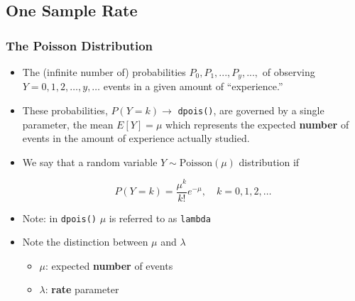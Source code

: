 \documentclass[10pt,handout]{beamer}\usepackage[]{graphicx}\usepackage[]{color}
\begin{document}
\subsection{One Sample Rate}

\begin{frame}
	\frametitle{The Poisson Distribution}
	
	\begin{itemize}
		\small
		\setlength\itemsep{1em}
		\item The (infinite number of) probabilities $P_{0}, P_{1}, ..., P_{y}, ..., $ of observing 
		$Y = 0, 1, 2, \dots , y, \dots $ events in a given amount of ``experience.'' 
		
		\item These probabilities, $P(Y = k) \to$ \texttt{dpois()}, are governed by a single parameter, the mean $E[Y] = \mu$ which represents the expected \textbf{number} of events in the amount of experience actually studied. 
		
		\item We say that a random variable $Y \sim \textrm{Poisson}(\mu)$ distribution if 
		
		\[ P(Y=k) = \frac{\mu^k}{k!}e^{-\mu}, \quad k = 0, 1, 2, \ldots\]

		
		\item Note: in \texttt{dpois()} $\mu$ is referred to as \texttt{lambda}
		
		\item Note the distinction between $\mu$ and $\lambda$
		\begin{itemize}
			\item $\mu$: expected \textbf{number} of events
			\item $\lambda$: \textbf{rate} parameter
		\end{itemize}
	\end{itemize}
\end{frame}
\end{document}

